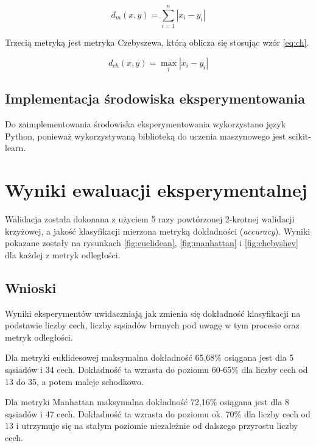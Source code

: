 \begin{center}
    \begin{equation}
        \label{eq:m}
        d_{m}\left( x,y\right)   = \sum_{i=1}^n |x_i-y_i|
    \end{equation}
\end{center}

\noindent
Trzecią metryką jest metryka Czebyszewa, którą oblicza się stosując wzór \ref{eq:ch}.

\begin{center}
    \begin{equation}
        \label{eq:ch}
        d_{ch}\left( x,y\right)   = \max_{i} |x_i-y_i|
    \end{equation}
\end{center}


\subsection{Implementacja środowiska eksperymentowania}
Do zaimplementowania środowiska eksperymentowania wykorzystano język Python, ponieważ wykorzystywaną biblioteką do uczenia maszynowego jest scikit-learn\cite{scikit}.

\section{Wyniki ewaluacji eksperymentalnej}
Walidacja została dokonana z użyciem 5 razy powtórzonej 2-krotnej walidacji krzyżowej, a jakość klasyfikacji mierzona metryką dokładności (\textit{accuracy}).
Wyniki pokazane zostały na rysunkach \ref{fig:euclidean}, \ref{fig:manhattan} i \ref{fig:chebyshev} dla każdej z metryk odległości.

\subsection{Wnioski}
Wyniki eksperymentów uwidaczniają jak zmienia się dokładność klasyfikacji na podstawie liczby cech, liczby sąsiadów branych pod uwagę w tym procesie oraz metryk odległości.

Dla metryki euklidesowej maksymalna dokładność 65,68\% osiągana jest dla 5 sąsiadów i 34 cech. Dokładność ta wzrasta do poziomu 60-65\% dla liczby cech od 13 do 35, a potem maleje schodkowo.

Dla metryki Manhattan maksymalna dokładność 72,16\% osiągana jest dla 8 sąsiadów i 47 cech. Dokładność ta wzrasta do poziomu ok. 70\% dla liczby cech od 13 i utrzymuje się na stałym poziomie niezależnie od dalszego przyrostu liczby cech.

